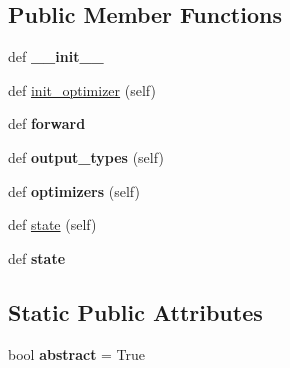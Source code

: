 \subsection*{Public Member Functions}
\begin{DoxyCompactItemize}
\item 
def {\bfseries \+\_\+\+\_\+init\+\_\+\+\_\+}\hypertarget{classrnn_1_1AttentionRNNDecoder_ac2fb22b90774fc0992f0fe2d03d7d697}{}\label{classrnn_1_1AttentionRNNDecoder_ac2fb22b90774fc0992f0fe2d03d7d697}

\item 
def \hyperlink{classrnn_1_1AttentionRNNDecoder_acf4927f9addaae2bc2d38eb3aac7353c}{init\+\_\+optimizer} (self)
\item 
def {\bfseries forward}\hypertarget{classrnn_1_1AttentionRNNDecoder_a5a07d962dc51732608e938a971b7551f}{}\label{classrnn_1_1AttentionRNNDecoder_a5a07d962dc51732608e938a971b7551f}

\item 
def {\bfseries output\+\_\+types} (self)\hypertarget{classrnn_1_1AttentionRNNDecoder_acd3abbdba97810519ea7867560f588e1}{}\label{classrnn_1_1AttentionRNNDecoder_acd3abbdba97810519ea7867560f588e1}

\item 
def {\bfseries optimizers} (self)\hypertarget{classrnn_1_1AttentionRNNDecoder_a65dece144c9b3924da10f7df664ad895}{}\label{classrnn_1_1AttentionRNNDecoder_a65dece144c9b3924da10f7df664ad895}

\item 
def \hyperlink{classrnn_1_1AttentionRNNDecoder_a59c5e56f0ed9ae9b5f259fe7a4293843}{state} (self)
\item 
def {\bfseries state}\hypertarget{classrnn_1_1AttentionRNNDecoder_a66f5dd341d9bf182d1b6dabb74dda027}{}\label{classrnn_1_1AttentionRNNDecoder_a66f5dd341d9bf182d1b6dabb74dda027}

\end{DoxyCompactItemize}
\subsection*{Static Public Attributes}
\begin{DoxyCompactItemize}
\item 
bool {\bfseries abstract} = True\hypertarget{classrnn_1_1AttentionRNNDecoder_ae72e8e8842b1ff3cf42f0fa799c13db5}{}\label{classrnn_1_1AttentionRNNDecoder_ae72e8e8842b1ff3cf42f0fa799c13db5}

\end{DoxyCompactItemize}
